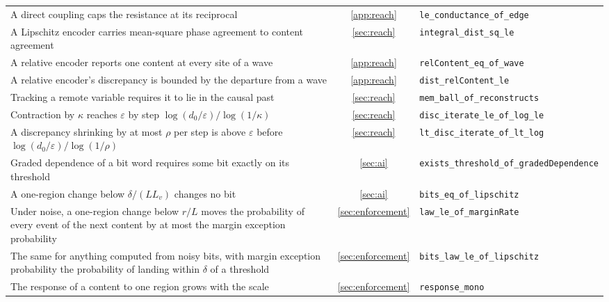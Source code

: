 \documentclass[12pt]{article}
\begin{document}
{\begin{longtable}{>{\raggedright\arraybackslash}p{}c>{\raggedright\arraybackslash}p{}}
A direct coupling caps the resistance at its reciprocal & \ref{app:reach} & \texttt{le\_\allowbreak{}conductance\_\allowbreak{}of\_\allowbreak{}edge} \\
A Lipschitz encoder carries mean-square phase agreement to content agreement & \ref{sec:reach} & \texttt{integral\_\allowbreak{}dist\_\allowbreak{}sq\_\allowbreak{}le} \\
A relative encoder reports one content at every site of a wave & \ref{app:reach} & \texttt{relContent\_\allowbreak{}eq\_\allowbreak{}of\_\allowbreak{}wave} \\
A relative encoder's discrepancy is bounded by the departure from a wave & \ref{app:reach} & \texttt{dist\_\allowbreak{}relContent\_\allowbreak{}le} \\
Tracking a remote variable requires it to lie in the causal past & \ref{sec:reach} & \texttt{mem\_\allowbreak{}ball\_\allowbreak{}of\_\allowbreak{}reconstructs} \\
Contraction by $\kappa$ reaches $\varepsilon$ by step $\log(d_0/\varepsilon)/\log(1/\kappa)$ & \ref{sec:reach} & \texttt{disc\_\allowbreak{}iterate\_\allowbreak{}le\_\allowbreak{}of\_\allowbreak{}log\_\allowbreak{}le} \\
A discrepancy shrinking by at most $\rho$ per step is above $\varepsilon$ before $\log(d_0/\varepsilon)/\log(1/\rho)$ & \ref{sec:reach} & \texttt{lt\_\allowbreak{}disc\_\allowbreak{}iterate\_\allowbreak{}of\_\allowbreak{}lt\_\allowbreak{}log} \\
Graded dependence of a bit word requires some bit exactly on its threshold & \ref{sec:ai} & \texttt{exists\_\allowbreak{}threshold\_\allowbreak{}of\_\allowbreak{}gradedDependence} \\
A one-region change below $\delta/(L L_v)$ changes no bit & \ref{sec:ai} & \texttt{bits\_\allowbreak{}eq\_\allowbreak{}of\_\allowbreak{}lipschitz} \\
Under noise, a one-region change below $r/L$ moves the probability of every event of the next content by at most the margin exception probability & \ref{sec:enforcement} & \texttt{law\_\allowbreak{}le\_\allowbreak{}of\_\allowbreak{}marginRate} \\
The same for anything computed from noisy bits, with margin exception probability the probability of landing within $\delta$ of a threshold & \ref{sec:enforcement} & \texttt{bits\_\allowbreak{}law\_\allowbreak{}le\_\allowbreak{}of\_\allowbreak{}lipschitz} \\
The response of a content to one region grows with the scale & \ref{sec:enforcement} & \texttt{response\_\allowbreak{}mono} \\

\end{longtable}}
\end{document}
